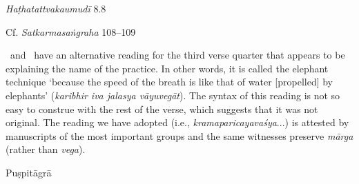\begin{ekdosis}
\begin{testimonia}[hp02_029]
\emph{Haṭhatattvakaumudī} 8.8

\begin{versinnote}
\end{versinnote}

Cf. \emph{Satkarmasaṅgraha} 108–109

\begin{versinnote}
\end{versinnote}
\end{testimonia}

\begin{philcomm}[hp02_029]
\etaTwo\ and \betaOmega\ have an alternative reading for the third verse quarter that appears to be explaining the name of the practice. In other words, it is called the elephant technique `because the speed of the breath is like that of water [propelled] by elephants’ (\emph{karibhir iva jalasya vāyuvegāt}). The syntax of this reading is not so easy to construe with the rest of the verse, which suggests that it was not original. The reading we have adopted (i.e., \emph{kramaparicayavaśya}...) is attested by manuscripts of the most important groups and the same witnesses preserve \emph{mārga} (rather than \emph{vega}). 

\end{philcomm}

\begin{metre}[hp02_029]
Puṣpitāgrā
\end{metre}


\end{ekdosis}
